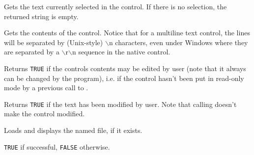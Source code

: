 

\label{wxtextctrlgetstringselection}


Gets the text currently selected in the control. If there is no selection, the
returned string is empty.

\label{wxtextctrlgetvalue}


Gets the contents of the control. Notice that for a multiline text control,
the lines will be separated by (Unix-style) $\backslash$n characters, even under
Windows where they are separated by a $\backslash$r$\backslash$n sequence in the native control.

\label{wxtextctrliseditable}


Returns {\tt TRUE} if the controls contents may be edited by user (note that it
always can be changed by the program), i.e. if the control hasn't been put in
read-only mode by a previous call to 
.

\label{wxtextctrlismodified}


Returns {\tt TRUE} if the text has been modified by user. Note that calling 
 doesn't make the control modified.

\label{wxtextctrlloadfile}


Loads and displays the named file, if it exists.




{\tt TRUE} if successful, {\tt FALSE} otherwise.

\label{wxtextctrlonchar}

